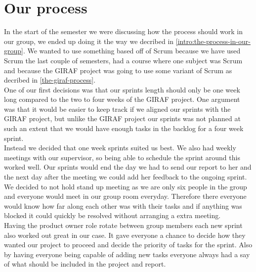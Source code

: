 \section{Our process}
In the start of the semester we were discussing how the process should work in our group, we ended up doing it the way we decribed in \autoref{intro:the-process-in-our-group}.
We wanted to use something based off of Scrum because we have used Scrum the last couple of semesters, had a course where one subject was Scrum and because the GIRAF project was going to use some variant of Scrum as decribed in \autoref{the-giraf-process}.
\\
One of our first decisions was that our sprints length should only be one week long compared to the two to four weeks of the GIRAF project.
One argument was that it would be easier to keep track if we aligned our sprints with the GIRAF project, but unlike the GIRAF project our sprints was not planned at such an extent that we would have enough tasks in the backlog for a four week sprint.
\\
Instead we decided that one week sprints suited us best.
We also had weekly meetings with our supervisor, so being able to schedule the sprint around this worked well.
Our sprints would end the day we had to send our report to her and the next day after the meeting we could add her feedback to the ongoing sprint.
\\
We decided to not hold stand up meeting as we are only six people in the group and everyone would meet in our group room everyday.
Therefore there everyone would know how far along each other was with their tasks and if anything was blocked it could quickly be resolved without arranging a extra meeting.
\\
Having the product owner role rotate between group members each new sprint also worked out great in our case.
It gave everyone a chance to decide how they wanted our project to proceed and decide the priority of tasks for the sprint.
Also by having everyone being capable of adding new tasks everyone always had a say of what should be included in the project and report.
